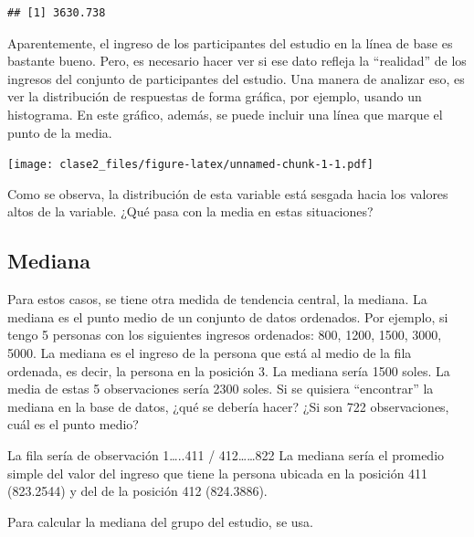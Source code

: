 \documentclass[
]{article}
\newenvironment{Shaded}{\begin{snugshade}}{\end{snugshade}}
\newcommand{\AttributeTok}[1]{\textcolor[rgb]{0.77,0.63,0.00}{#1}}
\newcommand{\FunctionTok}[1]{\textcolor[rgb]{0.00,0.00,0.00}{#1}}
\newcommand{\NormalTok}[1]{#1}
\newcommand{\SpecialCharTok}[1]{\textcolor[rgb]{0.00,0.00,0.00}{#1}}
\newcommand{\StringTok}[1]{\textcolor[rgb]{0.31,0.60,0.02}{#1}}
\begin{document}
\begin{verbatim}
## [1] 3630.738
\end{verbatim}

Aparentemente, el ingreso de los participantes del estudio en la línea
de base es bastante bueno. Pero, es necesario hacer ver si ese dato
refleja la ``realidad'' de los ingresos del conjunto de participantes
del estudio. Una manera de analizar eso, es ver la distribución de
respuestas de forma gráfica, por ejemplo, usando un histograma. En este
gráfico, además, se puede incluir una línea que marque el punto de la
media.

\begin{Shaded}
\end{Shaded}

\texttt{[image: clase2\_files/figure-latex/unnamed-chunk-1-1.pdf]}

Como se observa, la distribución de esta variable está sesgada hacia los
valores altos de la variable. ¿Qué pasa con la media en estas
situaciones?

\hypertarget{mediana-1}{%
\subsection{Mediana}\label{mediana-1}}

Para estos casos, se tiene otra medida de tendencia central, la mediana.
La mediana es el punto medio de un conjunto de datos ordenados. Por
ejemplo, si tengo 5 personas con los siguientes ingresos ordenados: 800,
1200, 1500, 3000, 5000. La mediana es el ingreso de la persona que está
al medio de la fila ordenada, es decir, la persona en la posición 3. La
mediana sería 1500 soles. La media de estas 5 observaciones sería 2300
soles. Si se quisiera ``encontrar'' la mediana en la base de datos, ¿qué
se debería hacer? ¿Si son 722 observaciones, cuál es el punto medio?

La fila sería de observación 1\ldots..411 / 412\ldots\ldots822 La
mediana sería el promedio simple del valor del ingreso que tiene la
persona ubicada en la posición 411 (823.2544) y del de la posición 412
(824.3886).

Para calcular la mediana del grupo del estudio, se usa.
\end{document}

